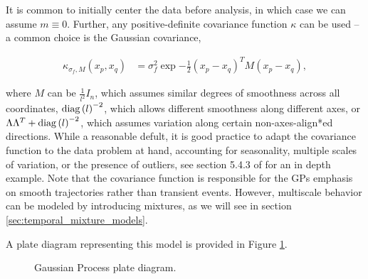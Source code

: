 \documentclass[14pt]{extreport}
\begin{document}
It is common to initially center the data before analysis, in which case we can
assume $m \equiv 0$. Further, any positive-definite covariance function $\kappa$
can be used -- a common choice is the Gaussian covariance,

\begin{align*}
\kappa_{\sigma_{f}, M}\left(x_{p}, x_{q}\right) &= \sigma_{f}^{2}\exp{-\frac{1}{2}\left(x_{p} - x_{q}\right)^{T}M\left(x_{p} - x_{q}\right)},
\end{align*}

where $M$ can be $\frac{1}{l^{2}}I_{n}$, which assumes similar degrees of smoothness
across all coordinates, $\mathop\mathrm{diag}\left(l\right)^{-2}$, which allows different
smoothness along different axes, or $\Lambda \Lambda^{T} + \mathop\mathrm{diag}\left(l\right)^{-2}$,
which assumes variation along certain non-axes-align*ed directions. While a
reasonable defult, it is good practice to adapt the covariance function to the
data problem at hand, accounting for seasonality, multiple scales of variation,
or the presence of outliers, see section 5.4.3 of \citep{rasmussen2006gaussian}
for an in depth example. Note that the covariance function is responsible for
the GPs emphasis on smooth trajectories rather than transient events. However,
multiscale behavior can be modeled by introducing mixtures, as we will see in
section \ref{sec:temporal_mixture_models}.

A plate diagram representing this model is provided in Figure \ref{fig:gp_plate}.

\begin{figure}
  \centering

  \caption{Gaussian Process plate diagram.\label{fig:gp_plate} }
\end{figure}
\end{document}

